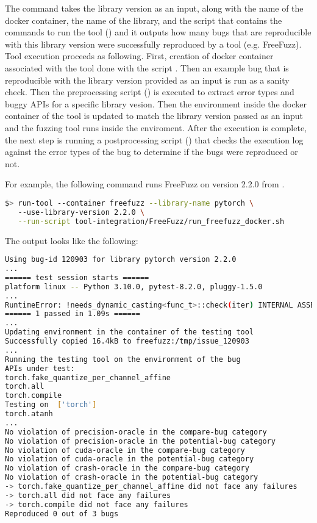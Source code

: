 \documentclass[sigconf,screen]{acmart}
\begin{document}
The command  takes the library version as an input, along with the name of the docker container, the name of the library, and the script that contains the commands to run the tool () and it outputs how many bugs that are reproducible with this library version were successfully reproduced by a tool (e.g. FreeFuzz).
Tool execution proceeds as following. First, creation of docker
container associated with the tool done with the script . 
Then an example bug that is reproducible with the library version provided as an input is run as a sanity check. 
Then the preprocessing
script () is executed to extract error types and buggy APIs for a specific library
vesion. Then the environment inside
the docker container of the tool is updated to match the library version passed as an input and the fuzzing tool runs inside the enviroment. After the execution is complete, the next step is running a postprocessing script () that checks the execution log against the error types of the bug to determine if the bugs were reproduced or not.

For example, the following command runs FreeFuzz
on version 2.2.0 from \torch.

\begin{lstlisting}[language=bash,basicstyle=\small,keywords={}]
$> run-tool --container freefuzz --library-name pytorch \ 
   --use-library-version 2.2.0 \
   --run-script tool-integration/FreeFuzz/run_freefuzz_docker.sh
\end{lstlisting}

The output looks like the following:

\begin{lstlisting}[language=bash,basicstyle=\small,keywords={}]
Using bug-id 120903 for library pytorch version 2.2.0
...
====== test session starts ======
platform linux -- Python 3.10.0, pytest-8.2.0, pluggy-1.5.0
...
RuntimeError: !needs_dynamic_casting<func_t>::check(iter) INTERNAL ASSERT FAILED at "../aten/src/ATen/native/cpu/Loops.h":310, please report a bug to PyTorch.
====== 1 passed in 1.09s ======
...
Updating environment in the container of the testing tool
Successfully copied 16.4kB to freefuzz:/tmp/issue_120903
...
Running the testing tool on the environment of the bug
APIs under test:
torch.fake_quantize_per_channel_affine
torch.all
torch.compile
Testing on  ['torch']
torch.atanh
...
No violation of precision-oracle in the compare-bug category
No violation of precision-oracle in the potential-bug category
No violation of cuda-oracle in the compare-bug category
No violation of cuda-oracle in the potential-bug category
No violation of crash-oracle in the compare-bug category
No violation of crash-oracle in the potential-bug category
-> torch.fake_quantize_per_channel_affine did not face any failures
-> torch.all did not face any failures
-> torch.compile did not face any failures
Reproduced 0 out of 3 bugs
\end{lstlisting}
\end{document}
